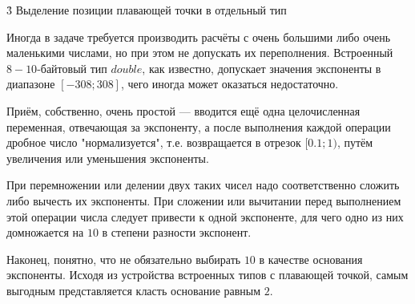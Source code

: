 \h3{ Выделение позиции плавающей точки в отдельный тип }

Иногда в задаче требуется производить расчёты с очень большими либо очень маленькими числами, но при этом не допускать их переполнения. Встроенный $8-10$-байтовый тип $double$, как известно, допускает значения экспоненты в диапазоне $[-308; 308]$, чего иногда может оказаться недостаточно.

Приём, собственно, очень простой --- вводится ещё одна целочисленная переменная, отвечающая за экспоненту, а после выполнения каждой операции дробное число "нормализуется", т.е. возвращается в отрезок $[0.1; 1)$, путём увеличения или уменьшения экспоненты.

При перемножении или делении двух таких чисел надо соответственно сложить либо вычесть их экспоненты. При сложении или вычитании перед выполнением этой операции числа следует привести к одной экспоненте, для чего одно из них домножается на $10$ в степени разности экспонент.

Наконец, понятно, что не обязательно выбирать $10$ в качестве основания экспоненты. Исходя из устройства встроенных типов с плавающей точкой, самым выгодным представляется класть основание равным $2$.